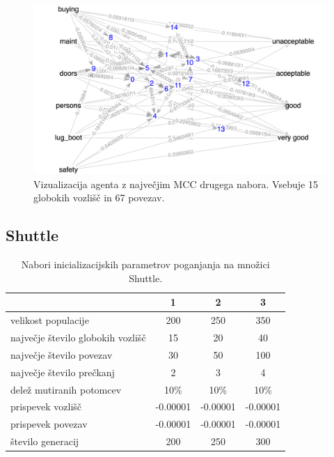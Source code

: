 \begin{figure}[H]
    \begin{center}
        \includegraphics[width=13cm]{car/3/mcc_g}
    \end{center}
    \caption{Vizualizacija agenta z največjim MCC drugega nabora. Vsebuje 15 globokih vozlišč in 67 povezav.}
    \label{fig:car_mcc_3_g}
\end{figure}


\subsection{Shuttle}\label{subsec:statlog_test}
\begin{table}[H]
    \caption{Nabori inicializacijskih parametrov poganjanja na množici Shuttle.}
    \begin{center}
        \begin{tabular}{||l c c c||}
            \hline
            & 1        & 2        & 3 \\ [0.5ex]
            \hline
            velikost populacije               & 200      & 250      & 350      \\
            \hline
            največje število globokih vozlišč & 15       & 20       & 40       \\
            \hline
            največje število povezav          & 30       & 50       & 100      \\
            \hline
            največje število prečkanj         & 2        & 3        & 4        \\
            \hline
            delež mutiranih potomcev          & 10\%     & 10\%     & 10\%     \\
            \hline
            prispevek vozlišč                 & -0.00001 & -0.00001 & -0.00001 \\
            \hline
            prispevek povezav                 & -0.00001 & -0.00001 & -0.00001 \\
            \hline
            število generacij                 & 200      & 250      & 300      \\
            \hline
        \end{tabular}
    \end{center}
    \label{tab:param_statlog}
\end{table}

